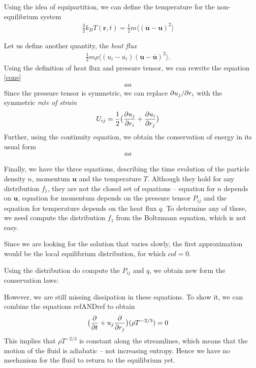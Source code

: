 Using the idea of equipartition, we can define the temperature for the non-equilibrium system
\begin{align*}
\frac{3}{2}k_B T(\bm{r},t) = \frac{1}{2} m \langle (\overline{\bm{u}} - \bm{u})^2 \rangle
\end{align*}

Let us define another quantity, the \textit{heat flux}
\begin{align*}
\frac{1}{2} m \rho \langle (u_i - \overline{u_i})(\bm{u} - \bm{\overline{u}})^2 \rangle.
\end{align*}
Using the definition of heat flux and pressure tensor, we can rewrite the equation \ref{cone}
\begin{align*}
aa
\end{align*}
Since the pressure tensor is symmetric, we can replace $\partial u_j / \partial r_i$ with the symmetric \textit{rate of strain}
\begin{align*}
U_{ij} = \frac{1}{2}\big( \frac{\partial u_j}{\partial r_i} + \frac{\partial u_i}{\partial r_j} \big)
\end{align*}
Further, using the continuity equation, we obtain the conservation of energy in its usual form
\begin{align*}
aa
\end{align*}

Finally, we have the three equations, describing the time evolution of the particle density $n$, momentum $\bm{u}$ and the temperature $T$.
Although they hold for any distribution $f_1$, they are not the closed set of equations -- equation for $n$ depends on $\bm{u}$, equation for momentum depends on the pressure tensor $P_{ij}$ and the equation for temperature depends on the heat flux $q$. To determine any of these, we need compute the distribution $f_1$ from the Boltzmann equation, which is not easy.

\bigskip

Since we are looking for the solution that varies slowly, the first approximation would be the  local equilibrium distribution, for which $col=0$.
%

Using the distribution do compute the $P_{ij}$ and $q$, we obtain new form the conservation laws:

However, we are still missing dissipation in these equations. To show it, we can combine the equations refANDref to obtain
\begin{align*}
\big( \frac{\partial}{\partial t} + u_j \frac{\partial}{\partial r_j} \big) (\rho T ^{-2/3}) = 0
\end{align*}
This implies that $\rho T^{-2/3}$ is constant along the streamlines, which means that the motion of the fluid is adiabatic -- not increasing entropy. Hence we have no mechanism for the fluid to return to the equilibrium yet.

